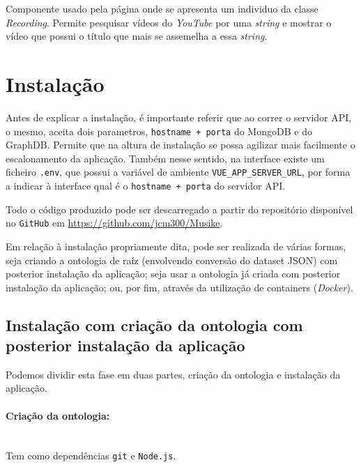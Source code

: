 \documentclass{article}
\begin{document}
Componente usado pela página onde se apresenta um individuo da classe \textit{Recording}. Permite pesquisar vídeos do \textit{YouTube} por uma \textit{string} e mostrar o vídeo que possui o título que mais se assemelha a essa \textit{string}.

\section{Instalação}

Antes de explicar a instalação, é importante referir que ao correr o servidor API, o mesmo, aceita dois parametros, \texttt{hostname + porta} do MongoDB e do GraphDB. Permite que na altura de instalação se possa agilizar mais facilmente o escalonamento da aplicação. Também nesse sentido, na interface existe um ficheiro \texttt{.env}, que possui a variável de ambiente \texttt{VUE\_APP\_SERVER\_URL}, por forma a indicar à interface qual é o \texttt{hostname + porta} do servidor API.

Todo o código produzido pode ser descarregado a partir do repositório disponível no \texttt{GitHub} em \url{https://github.com/jcm300/Musike}. 

Em relação à instalação propriamente dita, pode ser realizada de várias formas, seja criando a ontologia de raíz (envolvendo conversão do dataset JSON) com posterior instalação da aplicação; seja usar a ontologia já criada com posterior instalação da aplicação; ou, por fim, através da utilização de containers (\textit{Docker}).

\subsection{Instalação com criação da ontologia com posterior instalação da aplicação}

Podemos dividir esta fase em duas partes, criação da ontologia e instalação da aplicação.

\paragraph{Criação da ontologia:}\mbox{}\\

Tem como dependências \texttt{git} e \texttt{Node.js}.
\end{document}
